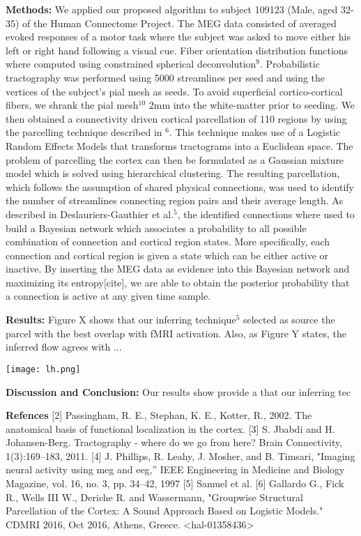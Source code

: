 \textbf{Methods:} 
We applied our proposed algorithm to subject 109123 (Male, aged 32-35) of the Human Connectome Project. The MEG data consisted of averaged evoked responses of a motor task where the subject was asked to move either his left or right hand following a visual cue. Fiber orientation distribution functions where computed using constrained spherical deconvolution$^9$.
Probabilistic tractography was performed using 5000 streamlines per seed and using the vertices of the subject's pial mesh as seeds.
To avoid superficial cortico-cortical fibers, we shrank the pial mesh$^{10}$ $2$mm into the white-matter prior to seeding.
We then obtained a connectivity driven cortical parcellation of 110 regions by using the parcelling technique described in $^6$.
This technique makes use of a Logistic Random Effects Models that transforms tractograms into a Euclidean space.
The problem of parcelling the cortex can then be formulated as a Gaussian mixture model which is solved using hierarchical clustering.
The resulting parcellation, which follows the assumption of shared physical connections, was used to identify the number of streamlines connecting region pairs and their average length.
As described in Deslauriers-Gauthier et al.$^5$, the identified connections where used to build a Bayesian network which associates a probability to all possible combination of connection and cortical region states. 
More specifically, each connection and cortical region is given a state which can be either active or inactive.
By inserting the MEG data as evidence into this Bayesian network and maximizing its entropy[cite], we are able to obtain the posterior probability that a connection is active at any given time sample.



\textbf{Results:} Figure X shows that our inferring technique$^5$ selected as
source the parcel with the best overlap with fMRI activation. Also, 
as Figure Y states, the inferred flow agrees with ...

\texttt{[image: lh.png]}

%
%

\textbf{Discussion and Conclusion:} Our results show provide a that our inferring
tec

\textbf{Refences}
[2] Passingham, R. E., Stephan, K. E., Kotter, R., 2002. The anatomical
basis of functional localization in the cortex.
[3] S. Jbabdi and H. Johansen-Berg. Tractography - where do we go from here?
Brain Connectivity, 1(3):169–183, 2011.
[4] J. Phillips, R. Leahy, J. Mosher, and B. Timsari, "Imaging neural activity using meg and eeg,”
IEEE Engineering in Medicine and Biology Magazine, vol. 16, no. 3, pp. 34–42, 1997
[5] Samuel et al.
[6] Gallardo G., Fick R., Wells III W., Deriche R. and Wassermann, "Groupwise
Structural Parcellation of the Cortex: A Sound Approach Based on Logistic Models."
CDMRI 2016, Oct 2016, Athens, Greece. <hal-01358436> 
